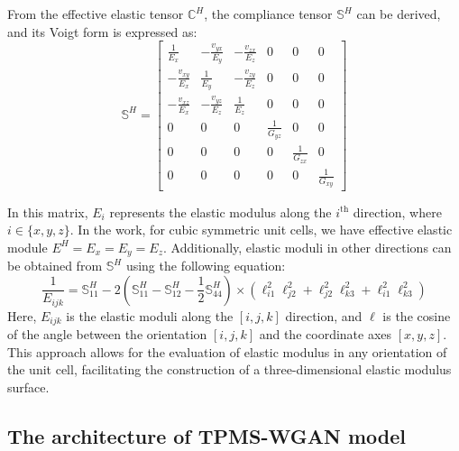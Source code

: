 \documentclass[preprint,review,12pt,authoryear]{elsarticle}
\begin{document}
From the effective elastic tensor $\mathbb{C}^H$, the compliance tensor $\mathbb{S}^H$ can be derived, and its Voigt form is expressed as:
\begin{equation}
\mathbb{S}^H = \begin{bmatrix}
\frac{1}{E_x} & -\frac{v_{yx}}{E_y} & -\frac{v_{zx}}{E_z} & 0 & 0 & 0 \\
-\frac{v_{xy}}{E_x} & \frac{1}{E_y} & -\frac{v_{zy}}{E_z} & 0 & 0 & 0 \\
-\frac{v_{xz}}{E_x} & -\frac{v_{yz}}{E_z} & \frac{1}{E_z} & 0 & 0 & 0 \\
0 & 0 & 0 & \frac{1}{G_{yz}} & 0 & 0 \\
0 & 0 & 0 & 0 & \frac{1}{G_{zx}} & 0 \\
0 & 0 & 0 & 0 & 0 & \frac{1}{G_{xy}}
\end{bmatrix}
\label{eq:5}
\end{equation}

In this matrix, $E_i$ represents the elastic modulus along the $i^{\text{th}}$ direction, where $i \in \{x, y, z\}$. In the work, for cubic symmetric unit cells, we have effective elastic module $E^H=E_x=E_y=E_z$. Additionally, elastic moduli in other directions can be obtained from $\mathbb{S}^H$ using the following equation:
\begin{equation}
\frac{1}{E_{ijk}} = \mathbb{S}^H_{11} - 2 \left(\mathbb{S}^H_{11} - \mathbb{S}^H_{12} - \frac{1}{2} \mathbb{S}^H_{44} \right) \times \left( \ell_{i1}^2 \ell_{j2}^2 + \ell_{j2}^2 \ell_{k3}^2 + \ell_{i1}^2 \ell_{k3}^2 \right)
    \label{eq:6}
\end{equation}
Here, $E_{ijk}$ is the elastic moduli along the $[i,j,k]$ direction, and $\ell$ is the cosine of the angle between the orientation $[i,j,k]$ and the coordinate axes $[x, y, z]$. This approach allows for the evaluation of elastic modulus in any orientation of the unit cell, facilitating the construction of a three-dimensional elastic modulus surface.

\subsection{The architecture of TPMS-WGAN model}
\end{document}
